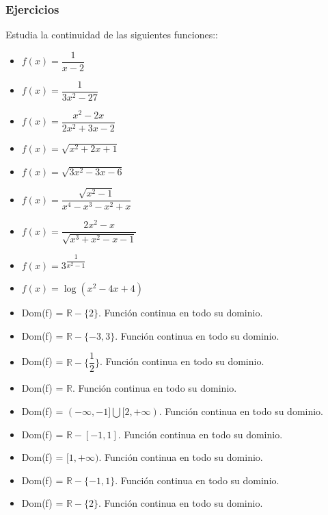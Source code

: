 \subsubsection{Ejercicios}
\begin{ex}
	Estudia la continuidad de las siguientes funciones::\\
	\begin{itemize}
		\item $f(x) = \dfrac{1}{x-2}$
		\item $f(x) = \dfrac{1}{3x^2-27}$
		\item $f(x) = \dfrac{x^2-2x}{2x^2+3x-2}$
		\item $f(x) = \sqrt{x^2+2x+1}$
		\item $f(x) = \sqrt{3x^2-3x-6}$
		\item $f(x) = \dfrac{\sqrt{x^2-1}}{x^4-x^3-x^2+x}$
		\item $f(x) = \dfrac{2x^2-x}{\sqrt{x^3+x^2-x-1}}$
		\item $f(x) = 3^{\dfrac{1}{x^2-1}}$
		\item $f(x) = \log(x^2-4x+4)$
	\end{itemize}
	\begin{sol}
		\begin{itemize}
			\item Dom(f) = $\mathbb{R}-\{2\}$. Función continua en todo su dominio.
			\item Dom(f) = $\mathbb{R}-\{-3,3\}$. Función continua en todo su dominio.
			\item Dom(f) = $\mathbb{R}-\{\dfrac{1}{2}\}$. Función continua en todo su dominio.
			\item Dom(f) = $\mathbb{R}$. Función continua en todo su dominio.
			\item Dom(f) = $(-\infty, -1] \bigcup [2,+\infty)$. Función continua en todo su dominio.
			\item Dom(f) = $\mathbb{R}-[-1,1]$. Función continua en todo su dominio.
			\item Dom(f) = $[1,+\infty)$. Función continua en todo su dominio.
			\item Dom(f) = $\mathbb{R}-\{-1, 1\}$. Función continua en todo su dominio.
			\item Dom(f) = $\mathbb{R}-\{2\}$. Función continua en todo su dominio.
		\end{itemize}
	\end{sol}
\end{ex}
